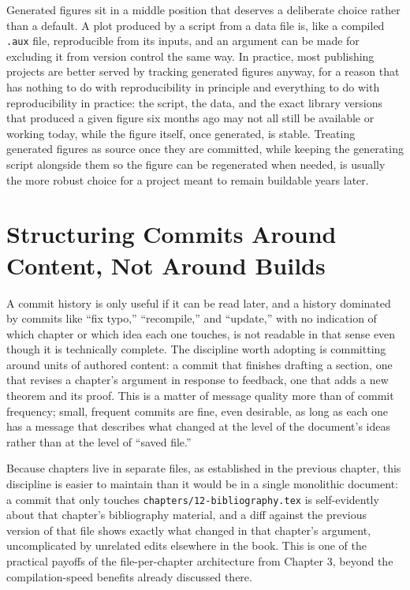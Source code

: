 Generated figures sit in a middle position that deserves a deliberate choice rather than a default. A plot produced by a script from a data file is, like a compiled \texttt{.aux} file, reproducible from its inputs, and an argument can be made for excluding it from version control the same way. In practice, most publishing projects are better served by tracking generated figures anyway, for a reason that has nothing to do with reproducibility in principle and everything to do with reproducibility in practice: the script, the data, and the exact library versions that produced a given figure six months ago may not all still be available or working today, while the figure itself, once generated, is stable. Treating generated figures as source once they are committed, while keeping the generating script alongside them so the figure can be regenerated when needed, is usually the more robust choice for a project meant to remain buildable years later.

\hypertarget{structuring-commits-around-content-not-around-builds}{%
\section{Structuring Commits Around Content, Not Around Builds}\label{structuring-commits-around-content-not-around-builds}}

A commit history is only useful if it can be read later, and a history dominated by commits like ``fix typo,'' ``recompile,'' and ``update,'' with no indication of which chapter or which idea each one touches, is not readable in that sense even though it is technically complete. The discipline worth adopting is committing around units of authored content: a commit that finishes drafting a section, one that revises a chapter's argument in response to feedback, one that adds a new theorem and its proof. This is a matter of message quality more than of commit frequency; small, frequent commits are fine, even desirable, as long as each one has a message that describes what changed at the level of the document's ideas rather than at the level of ``saved file.''

Because chapters live in separate files, as established in the previous chapter, this discipline is easier to maintain than it would be in a single monolithic document: a commit that only touches \texttt{chapters/12-bibliography.tex} is self-evidently about that chapter's bibliography material, and a diff against the previous version of that file shows exactly what changed in that chapter's argument, uncomplicated by unrelated edits elsewhere in the book. This is one of the practical payoffs of the file-per-chapter architecture from Chapter 3, beyond the compilation-speed benefits already discussed there.

